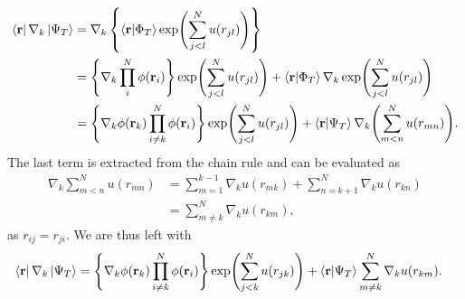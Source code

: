 \documentclass[
    a4paper, aps, twocolumn, floatfix, superscriptaddress]{revtex4-1}
\newcommand{\vf}{\mathbf}
\newcommand{\1}{\mathds{1}}
\newcommand{\brac}[1]{\left\{#1\right\}}
\begin{document}
            \begin{widetext}
                \begin{align}
                    \bra{\vf{r}}\nabla_k\ket{\Psi_T}
                    &= \nabla_k\brac{
                        \bra{\vf{r}}\ket{\Phi_T}
                        \exp\Biggl(
                            \sum_{j < l}^N u(r_{jl})
                        \Biggr)
                    } \\
                    &=
                    \Biggl\{
                        \nabla_k
                        \prod_i^N\phi(\vf{r}_i)
                    \Biggr\}
                    \exp\Biggl(
                        \sum_{j < l}^N u(r_{jl})
                    \Biggr)
                    +
                    \bra{\vf{r}}\ket{\Phi_T}
                    \nabla_k
                    \exp\Biggl(
                        \sum_{j < l}^N u(r_{jl})
                    \Biggr) \\
                    &=
                    \Biggl\{
                        \nabla_k\phi(\vf{r}_k)
                        \prod_{i \neq k}^N \phi(\vf{r}_i)
                    \Biggr\}
                    \exp\Biggl(
                        \sum_{j < l}^N u(r_{jl})
                    \Biggr)
                    +
                    \bra{\vf{r}}\ket{\Psi_T}
                    \nabla_k
                    \Biggl(
                        \sum_{m < n}^N u(r_{mn})
                    \Biggr).
                \end{align}
                The last term is extracted from the chain rule and can be
                evaluated as
                \begin{align}
                    \nabla_k
                        \sum_{m < n}^N u(r_{mn})
                    &=
                    \sum_{m = 1}^{k - 1}
                    \nabla_k u(r_{mk})
                    +
                    \sum_{n = k + 1}^N
                    \nabla_k u(r_{kn}) \\
                    &=
                    \sum_{m \neq k}^N\nabla_k u(r_{km}),
                \end{align}
                as $r_{ij} = r_{ji}$.  We are thus left with
                \begin{align}
                    \bra{\vf{r}}\nabla_k\ket{\Psi_T}
                    &=
                    \Biggl\{
                        \nabla_k\phi(\vf{r}_k)
                        \prod_{i \neq k}^N \phi(\vf{r}_i)
                    \Biggr\}
                    \exp\Biggl(
                        \sum_{j < k}^N u(r_{jk})
                    \Biggr)
                    +
                    \bra{\vf{r}}\ket{\Psi_T}
                    \sum_{m \neq k}^N\nabla_k u(r_{km}).
                \end{align}
            \end{widetext}
\end{document}
